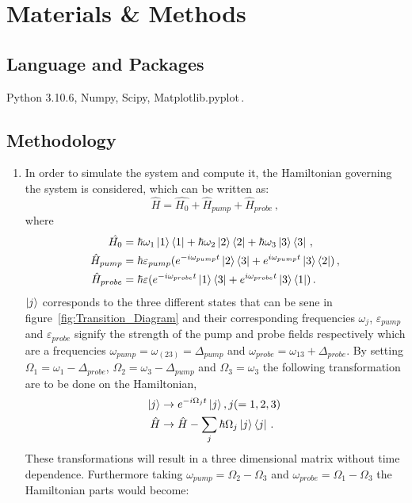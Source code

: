 \documentclass[12pt, a4paper]{article}
\begin{document}
\section{Materials \& Methods}
  \subsection{Language and Packages}
    Python 3.10.6, Numpy, Scipy, Matplotlib.pyplot\,.

  \subsection{Methodology}
  \begin{enumerate}
    \item In order to simulate the system and compute it, the Hamiltonian governing the system is considered, which can be written as:
    \begin{equation}
      \hat{H} = \hat{H_0} + \hat{H}_{pump} + \hat{H}_{probe}\,, 
    \end{equation}
    where 
    \begin{align}
      \hat{H_0}&=\hbar\omega_1\ket{1}\bra{1}+\hbar\omega_2 \ket{2}\bra{2} + \hbar\omega_3\ket{3}\bra{3}\,,\\
      \hat{H}_{pump} &= \hbar \varepsilon_{pump}(e^{-i\omega_{pump}t}\ket{2}\bra{3} + e^{i\omega_{pump}t}\ket{3}\bra{2})\,,\\
      \hat{H}_{probe} &= \hbar \varepsilon(e^{-i\omega_{probe}t}\ket{1}\bra{3} + e^{i\omega_{probe}t}\ket{3}\bra{1})\,. 
    \end{align}
    \(\ket{j}\) corresponds to the three different states that can be sene in figure~\ref{fig:Transition_Diagram} and their corresponding frequencies \(\omega_j\), \(\varepsilon_{pump}\) and \(\varepsilon_{probe}\) signify the strength of the pump and probe fields respectively which are a frequencies \(\omega_{pump} = \omega_(23) = \Delta_{pump}\) and \(\omega_{probe} = \omega_{13} + \Delta_{probe}\).    By setting \(\Omega_1 = \omega_1 - \Delta_{probe}\), \(\Omega_2 = \omega_3 - \Delta_{pump}\) and \(\Omega_3 = \omega_3\) the following transformation are to be done on the Hamiltonian,
    \begin{align}
      \ket{j} &\rightarrow e^{- i \Omega_j t}\ket{j}, j(=1,2,3)\,\\
      \hat{H} &\rightarrow \hat{H} - \sum_{j} \hbar \Omega_j \ket{j}\bra{j}\,.
    \end{align}
    These transformations will result in a three dimensional matrix without time dependence. Furthermore taking \(\omega_{pump} = \Omega_2 - \Omega_3\) and \(\omega_{probe} = \Omega_1 - \Omega_3\) the Hamiltonian parts would become:

\end{enumerate}
\end{document}

